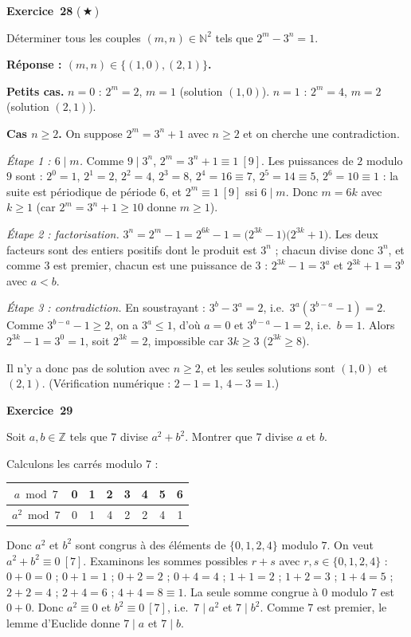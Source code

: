 \documentclass[11pt,a4paper]{article}
\begin{document}
	\medskip\noindent\textbf{\Large\color{bleu}Exercice~28} \textnormal{(\,$\bigstar$\,)}\nopagebreak
	\begin{enonce}
		Déterminer tous les couples $(m,n)\in\mathbb{N}^2$ tels que $2^m-3^n=1$.
	\end{enonce}
	\begin{corrige}
		\textbf{Réponse : $(m,n)\in\{(1,0),(2,1)\}$.}
		
		\textbf{Petits cas.} $n=0$ : $2^m=2$, $m=1$ (solution $(1,0)$). $n=1$ : $2^m=4$, $m=2$ (solution $(2,1)$).
		
		\textbf{Cas $n\geq2$.} On suppose $2^m=3^n+1$ avec $n\geq2$ et on cherche une contradiction.
		
		\emph{Étape 1 : $6\mid m$.} Comme $9\mid3^n$, $2^m=3^n+1\equiv1\ [9]$. Les puissances de $2$ modulo $9$ sont : $2^0=1$, $2^1=2$, $2^2=4$, $2^3=8$, $2^4=16\equiv7$, $2^5=14\equiv5$, $2^6=10\equiv1$ : la suite est périodique de période $6$, et $2^m\equiv1\ [9]$ ssi $6\mid m$. Donc $m=6k$ avec $k\geq1$ (car $2^m=3^n+1\geq10$ donne $m\geq1$).
		
		\emph{Étape 2 : factorisation.} $3^n=2^m-1=2^{6k}-1=\bigl(2^{3k}-1\bigr)\bigl(2^{3k}+1\bigr)$. Les deux facteurs sont des entiers positifs dont le produit est $3^n$ ; chacun divise donc $3^n$, et comme $3$ est premier, chacun est une puissance de $3$ : $2^{3k}-1=3^a$ et $2^{3k}+1=3^b$ avec $a<b$.
		
		\emph{Étape 3 : contradiction.} En soustrayant : $3^b-3^a=2$, i.e.\ $3^a(3^{b-a}-1)=2$. Comme $3^{b-a}-1\geq2$, on a $3^a\leq1$, d'où $a=0$ et $3^{b-a}-1=2$, i.e.\ $b=1$. Alors $2^{3k}-1=3^0=1$, soit $2^{3k}=2$, impossible car $3k\geq3$ ($2^{3k}\geq8$).
		
		Il n'y a donc pas de solution avec $n\geq2$, et les seules solutions sont $(1,0)$ et $(2,1)$. (Vérification numérique : $2-1=1$, $4-3=1$.)
	\end{corrige}
	
	\medskip\noindent\textbf{\Large\color{bleu}Exercice~29}\nopagebreak
	\begin{enonce}
		Soit $a,b\in\mathbb{Z}$ tels que $7$ divise $a^2+b^2$. Montrer que $7$ divise $a$ et $b$.
	\end{enonce}
	\begin{corrige}
		Calculons les carrés modulo $7$ :
		\begin{center}
			\begin{tabular}{c|ccccccc}
				$a\bmod7$&0&1&2&3&4&5&6\\\hline
				$a^2\bmod7$&0&1&4&2&2&4&1
			\end{tabular}
		\end{center}
		Donc $a^2$ et $b^2$ sont congrus à des éléments de $\{0,1,2,4\}$ modulo $7$. On veut $a^2+b^2\equiv0\ [7]$. Examinons les sommes possibles $r+s$ avec $r,s\in\{0,1,2,4\}$ : $0+0=0$ ; $0+1=1$ ; $0+2=2$ ; $0+4=4$ ; $1+1=2$ ; $1+2=3$ ; $1+4=5$ ; $2+2=4$ ; $2+4=6$ ; $4+4=8\equiv1$. La seule somme congrue à $0$ modulo $7$ est $0+0$. Donc $a^2\equiv0$ et $b^2\equiv0\ [7]$, i.e.\ $7\mid a^2$ et $7\mid b^2$. Comme $7$ est premier, le lemme d'Euclide donne $7\mid a$ et $7\mid b$.
	\end{corrige}
	
\end{document}
